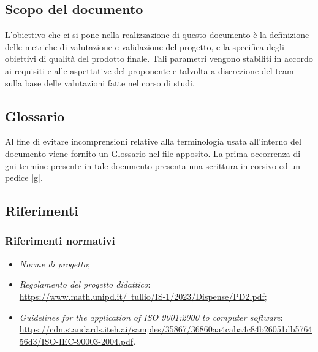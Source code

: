 \subsection{Scopo del documento}
L'obiettivo che ci si pone nella realizzazione di questo documento è la definizione delle metriche di valutazione e validazione del progetto, e la specifica degli obiettivi di qualità del prodotto finale. Tali parametri vengono stabiliti in accordo ai requisiti e 
alle aspettative del proponente e talvolta a discrezione del team sulla base delle valutazioni fatte nel corso di studi.

\subsection{Glossario}
Al fine di evitare incomprensioni relative alla terminologia usata all’interno del documento viene fornito un Glossario nel file apposito. La prima occorrenza di gni termine presente in tale documento presenta una scrittura in corsivo ed un pedice |g|.

\subsection{Riferimenti}
   \subsubsection{Riferimenti normativi}
   \begin{itemize}
    \item \textit{Norme di progetto};
    \item \textit{Regolamento del progetto didattico}: \\
    \href{https://www.math.unipd.it/~tullio/IS-1/2023/Dispense/PD2.pdf}{https://www.math.unipd.it/~tullio/IS-1/2023/Dispense/PD2.pdf};
    \item \textit{Guidelines for
    the application of ISO 9001:2000 to
    computer software}: \\
    \href{https://cdn.standards.iteh.ai/samples/35867/36860aa4caba4c84b26051db576456d3/ISO-IEC-90003-2004.pdf}{https://cdn.standards.iteh.ai/samples/35867/36860aa4caba4c84b26051db576456d3/ISO-IEC-90003-2004.pdf}.
    \end{itemize}
    
